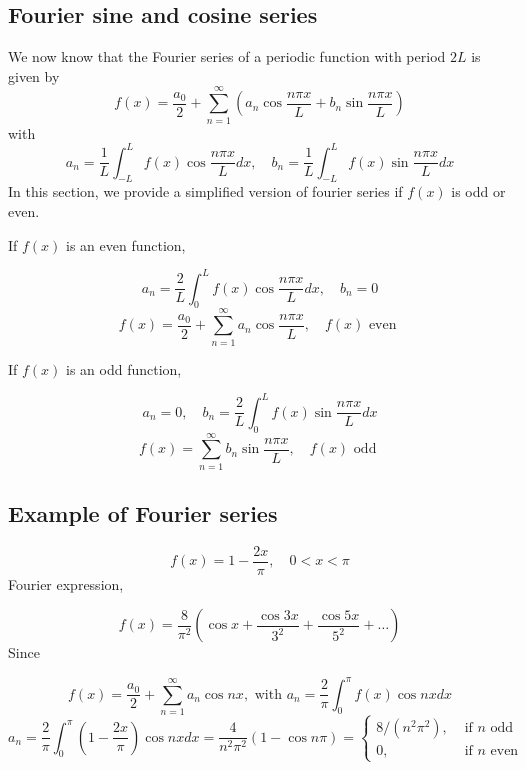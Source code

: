 \documentclass[a4]{article}
\begin{document}
\subsection{Fourier sine and cosine series}
We now know that the Fourier series of a periodic function with period $2 L$ is given by
$$
f(x)=\frac{a_{0}}{2}+\sum_{n=1}^{\infty}\left(a_{n} \cos \frac{n \pi x}{L}+b_{n} \sin \frac{n \pi x}{L}\right)
$$
with
$$
a_{n}=\frac{1}{L} \int_{-L}^{L} f(x) \cos \frac{n \pi x}{L} d x, \quad b_{n}=\frac{1}{L} \int_{-L}^{L} f(x) \sin \frac{n \pi x}{L} d x
$$
In this section, we provide a simplified version of fourier series if $f(x)$ is odd or even.\par 
\bigbreak 
If $f(x)$ is an even function,\par 
\begin{equation}a_{n}=\frac{2}{L} \int_{0}^{L} f(x) \cos \frac{n \pi x}{L} d x, \quad b_{n}=0\end{equation}
\begin{equation}f(x)=\frac{a_{0}}{2}+\sum_{n=1}^{\infty} a_{n} \cos \frac{n \pi x}{L}, \quad f(x) \text { even }\end{equation}\par 
\bigbreak
If $f(x)$ is an odd function,\par 
\begin{equation}a_{n}=0, \quad b_{n}=\frac{2}{L} \int_{0}^{L} f(x) \sin \frac{n \pi x}{L} d x\end{equation}
\begin{equation}f(x)=\sum_{n=1}^{\infty} b_{n} \sin \frac{n \pi x}{L}, \quad f(x) \text { odd }\end{equation}
\subsection{Example of Fourier series}
\begin{equation}f(x)=1-\frac{2 x}{\pi}, \quad 0<x<\pi\end{equation}
Fourier expression,\par
\begin{equation}f(x)=\frac{8}{\pi^{2}}\left(\cos x+\frac{\cos 3 x}{3^{2}}+\frac{\cos 5 x}{5^{2}}+\ldots\right)\end{equation}
\bigbreak
\noindent Since\par 
\begin{equation}f(x)=\frac{a_{0}}{2}+\sum_{n=1}^{\infty} a_{n} \cos n x, \text { with } a_{n}=\frac{2}{\pi} \int_{0}^{\pi} f(x) \cos n x d x\end{equation}
\begin{equation}a_{n}=\frac{2}{\pi} \int_{0}^{\pi}\left(1-\frac{2 x}{\pi}\right) \cos n x d x=\frac{4}{n^{2} \pi^{2}}(1-\cos n \pi)=\left\{\begin{array}{ll}
8 /\left(n^{2} \pi^{2}\right), & \text { if } n \text { odd } \\
0, & \text { if } n \text { even }
\end{array}\right.\end{equation}
\end{document}
